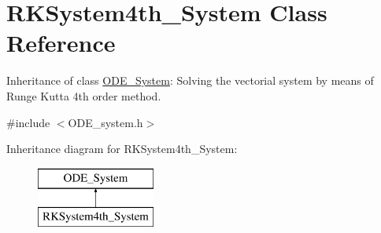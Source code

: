 \hypertarget{class_r_k_system4th___system}{}\section{R\+K\+System4th\+\_\+\+System Class Reference}
\label{class_r_k_system4th___system}


Inheritance of class \mbox{\hyperlink{class_o_d_e___system}{O\+D\+E\+\_\+\+System}}\+: Solving the vectorial system by means of Runge Kutta 4th order method.  




{\ttfamily \#include $<$O\+D\+E\+\_\+system.\+h$>$}

Inheritance diagram for R\+K\+System4th\+\_\+\+System\+:\begin{figure}[H]
\begin{center}
\leavevmode
\includegraphics[height=2.000000cm]{class_r_k_system4th___system}
\end{center}
\end{figure}
